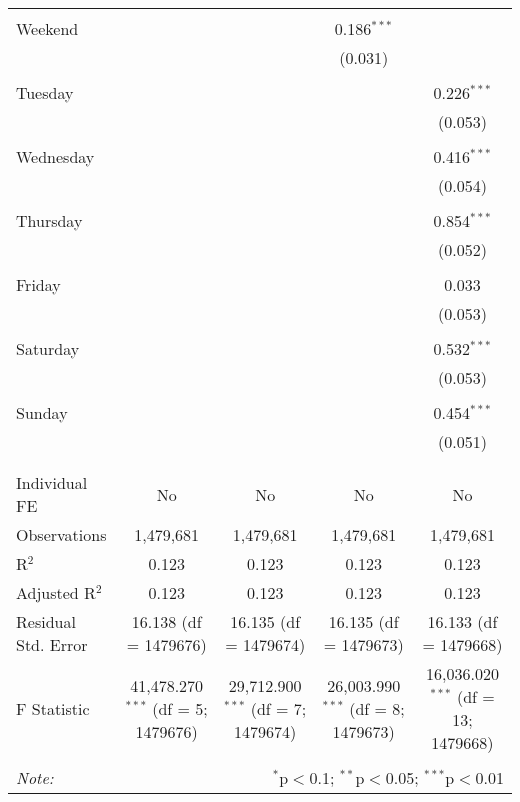 \documentclass[
]{article}
\begin{document}
\begin{table}[!htbp]
{\begin{tabular}{@{\extracolsep{5pt}}lcccc}
  & & & & \\ 
 Weekend &  &  & 0.186$^{***}$ &  \\ 
  &  &  & (0.031) &  \\ 
  & & & & \\ 
 Tuesday &  &  &  & 0.226$^{***}$ \\ 
  &  &  &  & (0.053) \\ 
  & & & & \\ 
 Wednesday &  &  &  & 0.416$^{***}$ \\ 
  &  &  &  & (0.054) \\ 
  & & & & \\ 
 Thursday &  &  &  & 0.854$^{***}$ \\ 
  &  &  &  & (0.052) \\ 
  & & & & \\ 
 Friday &  &  &  & 0.033 \\ 
  &  &  &  & (0.053) \\ 
  & & & & \\ 
 Saturday &  &  &  & 0.532$^{***}$ \\ 
  &  &  &  & (0.053) \\ 
  & & & & \\ 
 Sunday &  &  &  & 0.454$^{***}$ \\ 
  &  &  &  & (0.051) \\ 
  & & & & \\ 
\hline \\[-1.8ex] 
Individual FE & No & No & No & No \\ 
Observations & 1,479,681 & 1,479,681 & 1,479,681 & 1,479,681 \\ 
R$^{2}$ & 0.123 & 0.123 & 0.123 & 0.123 \\ 
Adjusted R$^{2}$ & 0.123 & 0.123 & 0.123 & 0.123 \\ 
Residual Std. Error & 16.138 (df = 1479676) & 16.135 (df = 1479674) & 16.135 (df = 1479673) & 16.133 (df = 1479668) \\ 
F Statistic & 41,478.270$^{***}$ (df = 5; 1479676) & 29,712.900$^{***}$ (df = 7; 1479674) & 26,003.990$^{***}$ (df = 8; 1479673) & 16,036.020$^{***}$ (df = 13; 1479668) \\ 
\hline 
\hline \\[-1.8ex] 
\textit{Note:}  & \multicolumn{4}{r}{$^{*}$p$<$0.1; $^{**}$p$<$0.05; $^{***}$p$<$0.01} \\ 
\end{tabular}
} 
\end{table} 
\newpage
\end{document}
